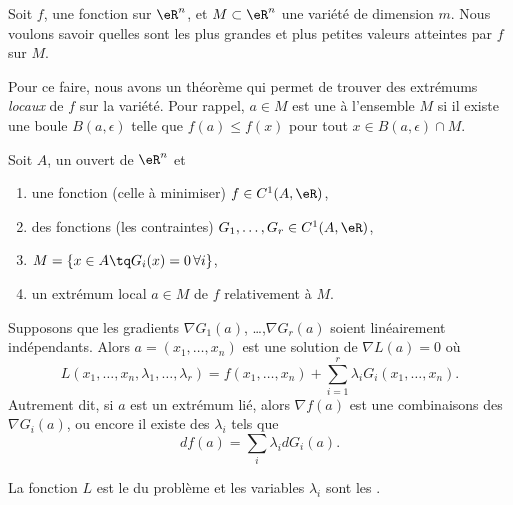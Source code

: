 Soit \( f\), une fonction sur \( \eR^n\), et \( M\subset \eR^n\) une variété de dimension \( m\). Nous voulons savoir quelles sont les plus grandes et plus petites valeurs atteintes par \( f\) sur \( M\).

Pour ce faire, nous avons un théorème qui permet de trouver des extrémums \emph{locaux} de \( f\) sur la variété. Pour rappel, \( a\in M\) est une  à l'ensemble \( M\) si il existe une boule \( B(a,\epsilon)\) telle que \( f(a)\leq f(x)\) pour tout \( x\in B(a,\epsilon)\cap M\).

\begin{theorem} \label{ThoRGJosS}
	Soit \( A\), un ouvert de \( \eR^n\) et
	\begin{enumerate}
		\item
		      une fonction (celle à minimiser) \( f\in C^1(A,\eR)\),
		\item
		      des fonctions (les contraintes) \( G_1,\ldots,G_r\in C^1(A,\eR)\),
		\item
		      \( M=\{ x\in A\tq G_i(x)=0\,\forall i\}\),
		\item
		      un extrémum local \( a\in M\) de \( f\) relativement à \( M\).
	\end{enumerate}
	Supposons que les gradients \( \nabla G_1(a)\), \ldots,\( \nabla G_r(a)\) soient linéairement indépendants. Alors \( a=(x_1,\ldots,x_n)\) est une solution de \( \nabla L(a)=0\) où
	\begin{equation}
		L(x_1,\ldots,x_n,\lambda_1,\ldots,\lambda_r)=f(x_1,\ldots,x_n)+\sum_{i=1}^r\lambda_iG_i(x_1,\ldots,x_n).
	\end{equation}
	Autrement dit, si \( a\) est un extrémum lié, alors \( \nabla f(a)\) est une combinaisons des \( \nabla G_i(a)\), ou encore il existe des \( \lambda_i\) tels que
	\begin{equation}    \label{EqRDsSXyZ}
		df(a)=\sum_i\lambda_idG_i(a).
	\end{equation}
\end{theorem}
La fonction \( L\) est le  du problème et les variables \( \lambda_i\) sont les .

